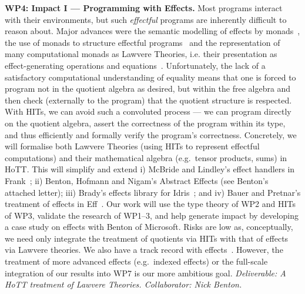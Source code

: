 \documentclass[a4paper,11pt]{article}
\newcommand{\eg}{{e.g.}\ }
\begin{document}
{\bf WP4: Impact I --- Programming with Effects.}  Most programs
interact with their environments, but such \emph{effectful} programs
are inherently difficult to reason about.  Major advances were the
semantic modelling of effects by monads~\cite{moggi:monad}, the use of
monads to structure effectful programs~\cite{wadler:monads} and the
representation of many computational monads as Lawvere Theories,
i.e. their presentation as effect-generating operations and
equations~\cite{PlotkinPower:Lawvere}. Unfortunately, the lack of a
satisfactory computational understanding of equality means that one is
forced to program not in the quotient algebra as desired, but within
the free algebra and then check (externally to the program) that the
quotient structure is respected.  With HITs, we can avoid such a
convoluted process --- we can program directly on the quotient
algebra, assert the correctness of the program within its type,
and thus efficiently and formally verify the program's
correctness. Concretely, we will formalise both Lawvere Theories
(using HITs to represent effectful computations) and their
mathematical algebra (e.g.\ tensor products, sums) in HoTT.  This will
simplify and extend i) McBride and Lindley's effect handlers in
Frank~\cite{conor:frank}; ii) Benton, Hofmann and Nigam's Abstract
Effects (see Benton's attached letter); iii) Brady's effects library
for Idris~\cite{brady:effects}; and iv) Bauer and Pretnar's treatment
of effects in Eff~\cite{bauer:eff}.  Our work will use the type theory
of WP2 and HITs of WP3, validate the research of WP1--3,
and help generate impact by developing a case study on effects with Benton of Microsoft.
Risks are low as,
conceptually, we need only integrate the treatment of quotients
via HITs with that of effects via Lawvere theories. We also have a
track record with effects~\cite{alti:beast,conor:frank,atkeyGhaniJacobsJohann:effects}.
However, the
treatment of more
advanced effects (\eg indexed effects) or the full-scale integration
of our results into WP7 is our more ambitious goal. {\em Deliverable: A HoTT
treatment of Lawvere Theories.  Collaborator: Nick
Benton.  }
\end{document}
